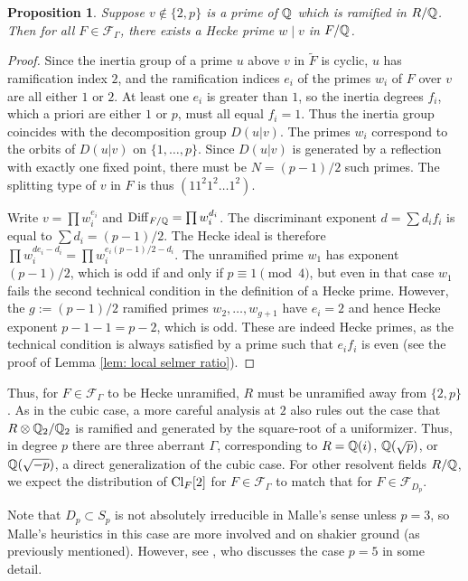 \documentclass[11pt,a4paper]{amsart}
\def\Q{{\rm \mathbb{Q}}}
\def\Cl{{\rm Cl}}
\def\Diff{{\rm Diff}}
\numberwithin{equation}{section}
\newtheorem{proposition}[theorem]{Proposition}
\begin{document}
\begin{proposition}\label{prop: dihedral hecke}
    Suppose $v \notin \{2,p\}$ is a prime of $\Q$ which is ramified in $R/\Q$. Then for all $F \in \mathcal{F}_\Gamma$, there exists a Hecke prime $w \mid v$ in $F/\Q$. 
\end{proposition}

\begin{proof}
Since the inertia group of a prime $u$ above $v$ in $\tilde F$ is cyclic, $u$ has ramification index $2$, and the ramification indices $e_i$ of the primes $w_i$ of $F$ over $v$ are all either $1$ or $2$. At least one $e_i$ is greater than $1$, so the inertia degrees $f_i$, which a priori are either $1$ or $p$, must all equal $f_i = 1$. Thus the inertia group coincides with the decomposition group $D(u|v)$. The primes $w_i$ correspond to the orbits of $D(u|v)$ on $\{1,\ldots, p\}$. Since $D(u|v)$ is generated by a reflection with exactly one fixed point, there must be $N = (p-1)/2$ such primes. The splitting type of $v$ in $F$ is thus $(1 1^2 1^2 \ldots 1^2)$. 

Write $v = \prod w_i^{e_i}$ and $\Diff_{F/\Q} = \prod w_i^{d_i}$. The discriminant exponent $d = \sum d_i f_i$ is equal to $\sum d_i = (p-1)/2$.  The Hecke ideal is therefore $\prod w_i^{de_i - d_i} = \prod w_i^{e_i(p-1)/2 - d_i}$. The unramified prime $w_1$ has exponent $(p-1)/2$, which is odd if and only if $p \equiv 1\pmod{4}$, but even in that case $w_1$ fails the second technical condition in the definition of a Hecke prime. However, the $g := (p-1)/2$ ramified primes $w_2,\ldots, w_{g+1}$ have $e_i = 2$ and hence Hecke exponent $p-1 - 1 = p-2$, which is odd. These are indeed Hecke primes, as the technical condition is always satisfied by a prime such that $e_if_i$ is even (see the proof of Lemma \ref{lem: local selmer ratio}). 
\end{proof}


Thus, for $F \in \mathcal{F}_\Gamma$ to be Hecke unramified, $R$ must be unramified away from $\{2,p\}$. As in the cubic case, a more careful analysis at $2$ also rules out the case that $R \otimes \Q_2/\Q_2$ is ramified and generated by the square-root of a uniformizer. Thus, in degree $p$ there are three aberrant $\Gamma$, corresponding to $R = \Q(i)$, $\Q(\sqrt{p})$, or $\Q(\sqrt{-p})$, a direct generalization of the cubic case.  For other resolvent fields $R/\Q$, we expect the  distribution of $\Cl_F[2]$ for $F \in \mathcal{F}_\Gamma$ to match that for $F \in \mathcal{F}_{D_p}$. 

Note that $D_p \subset S_p$ is not absolutely irreducible in Malle's sense unless $p = 3$, so Malle's heuristics in this case are more involved and on shakier ground (as previously mentioned). However, see \cite{Malle2010}, who discusses the case $p = 5$ in some detail.  
\end{document}
